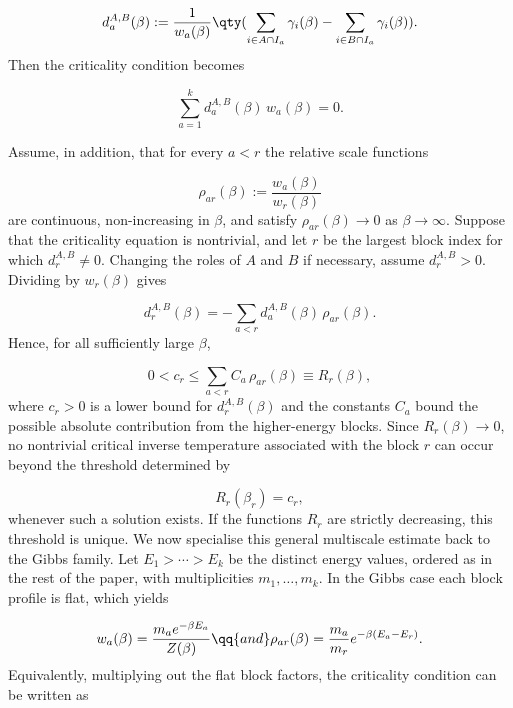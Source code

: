 \documentclass[11pt,a4paper,longbibliography]{amsart}
\numberwithin{equation}{section}
\theoremstyle{plain}
\theoremstyle{definition}
\theoremstyle{remark}
\begin{document}
		\begin{equation}
			d_a^{A,B}(\beta) := \frac{1}{w_a(\beta)}\qty(\sum_{i\in A\cap I_a} \gamma_i(\beta) - \sum_{i\in B\cap I_a} \gamma_i(\beta)) . 
		\end{equation}
		Then the criticality condition becomes 
		
		\begin{equation}
			\sum_{a=1}^k d_a^{A,B}(\beta)\,w_a(\beta)=0 . 
		\end{equation}
		
		Assume, in addition, that for every $a<r$ the relative scale functions 
		
		\begin{equation}
			\rho_{ar}(\beta) := \frac{w_a(\beta)}{w_r(\beta)} 
		\end{equation}
		are continuous, non-increasing in $\beta$, and satisfy $\rho_{ar}(\beta)\to0$ as $\beta\to\infty$. Suppose that the criticality equation is nontrivial, and let $r$ be the largest block index for which $d_r^{A,B}\neq0$. Changing the roles of $A$ and $B$ if necessary, assume $d_r^{A,B}>0$. Dividing by $w_r(\beta)$ gives 
		
		\begin{equation}
			d_r^{A,B}(\beta) = -\sum_{a<r} d_a^{A,B}(\beta)\, \rho_{ar}(\beta). 
		\end{equation}
		Hence, for all sufficiently large $\beta$, 
		
		\begin{equation}\label{eq:gen_max_crit}
			0<c_r \leq \sum_{a<r} C_a\,\rho_{ar}(\beta) \equiv R_r(\beta), 
		\end{equation}
		where $c_r>0$ is a lower bound for $d_r^{A,B}(\beta)$ and the constants $C_a$ bound the possible absolute contribution from the higher-energy blocks. Since $R_r(\beta)\to0$, no nontrivial critical inverse temperature associated with the block $r$ can occur beyond the threshold determined by 
		
		\begin{equation}
			R_r(\beta_r)=c_r, 
		\end{equation}
		whenever such a solution exists. If the functions $R_r$ are strictly decreasing, this threshold is unique. We now specialise this general multiscale estimate back to the Gibbs family. Let $E_1>\cdots>E_k$ be the distinct energy values, ordered as in the rest of the paper, with multiplicities $m_1,\ldots,m_k$. In the Gibbs case each block profile is flat, which yields
		
		\begin{equation}
			w_a(\beta) = \frac{m_a e^{-\beta E_a}}{Z(\beta)}\qq{and} \rho_{ar}(\beta) = \frac{m_a}{m_r} e^{-\beta(E_a-E_r)}.
		\end{equation}
		Equivalently, multiplying out the flat block factors, the criticality condition can be written as 
		
\end{document}
